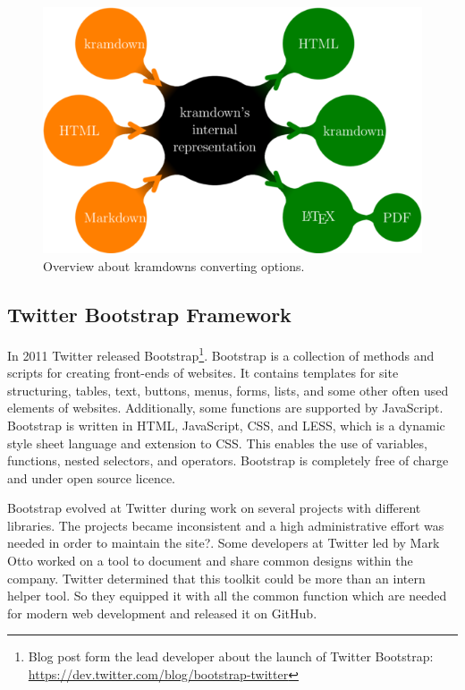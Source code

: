 \begin{figure}[htb]
\centering
\includegraphics[width=\textwidth]{figures/kramdown}
\caption{Overview about kramdowns converting options. \cite{kramdown}}
\label{fig:kramdown}
\end{figure}

\subsection{Twitter Bootstrap Framework}
In 2011 Twitter released Bootstrap\footnote{Blog post form the lead developer about the launch of Twitter Bootstrap: \url{https://dev.twitter.com/blog/bootstrap-twitter}}. Bootstrap is a collection of methods and scripts for creating front-ends of websites. It contains templates for site structuring, tables, text, buttons, menus, forms, lists, and some other often used elements of websites. Additionally, some functions are supported by JavaScript. Bootstrap is written in HTML, JavaScript, CSS, and LESS, which is a dynamic style sheet language and extension to CSS. This enables the use of variables, functions, nested selectors, and operators.\cite{less} Bootstrap is completely free of charge and under open source licence. \cite{bootstrap}

Bootstrap evolved at Twitter during work on several projects with different libraries. The projects became inconsistent and a high administrative effort was needed in order to maintain the site?. Some developers at Twitter led by Mark Otto worked on a tool to document and share common designs within the company. Twitter determined that this toolkit could be more than an intern helper tool. So they equipped it with all the common function which are needed for modern web development and released it on GitHub. \cite{markotto}

